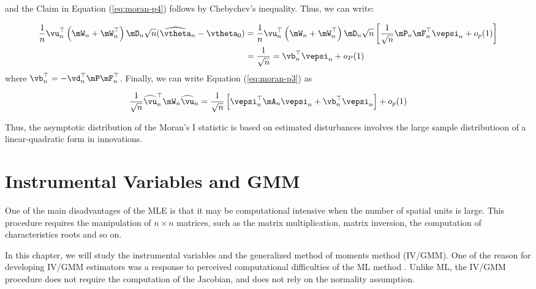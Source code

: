 \documentclass[english,12pt]{book}\usepackage[]{graphicx}\usepackage[]{xcolor}
\begin{document}
\begin{subappendices}
and the Claim in Equation (\ref{eq:moran-p4}) follows by Chebychev's inequality. Thus, we can write:


\begin{equation}
\begin{aligned}
\frac{1}{n}\vu_n^\top\left(\mW_n + \mW_n^\top\right)\mD_n\sqrt{n}(\widehat{\vtheta}_n - \vtheta_0) & =  \frac{1}{n}\vu_n^\top\left(\mW_n + \mW_n^\top\right)\mD_n\sqrt{n}\left[\frac{1}{\sqrt{n}}\mP_n\mF_n^\top\vepsi_n + o_p(1)\right] \\
& = \frac{1}{\sqrt{n}} = \vb_n^\top\vepsi_n + o_P(1)
\end{aligned}
\end{equation}
%
where $\vb_n^\top = -\vd_n^\top\mP\mF_n^\top$. Finally, we can write Equation (\ref{eq:moran-p3}) as

\begin{equation}
\frac{1}{\sqrt{n}}\widehat{\vu}_n^\top\mW_n\widehat{\vu}_n =\frac{1}{\sqrt{n}}\left[\vepsi_n^\top\mA_n\vepsi_n + \vb_n^\top\vepsi_n\right] + o_p(1)
\end{equation}

Thus, the asymptotic distribution of the Moran's I statistic is based on estimated disturbances involves the large sample distributioon of a linear-quadratic form in innovations. 


\end{subappendices}





\chapter{Instrumental Variables and GMM}

One of the main disadvantages of the MLE is that it may be computational intensive when the number of spatial units is large. This procedure requires the manipulation of $n \times n$ matrices, such as the matrix multiplication, matrix inversion, the computation of characteristics roots and so on. 

In this chapter, we will study the instrumental variables and the generalized method of moments method (IV/GMM).  One of the reason for developing IV/GMM estimators was a response to perceived computational difficulties of the ML method \citep{kelejian1998generalized, kelejian1999generalized}.  Unlike ML, the IV/GMM procedure does not require the computation of the Jacobian, and does not rely on the normality assumption.
\end{document}
